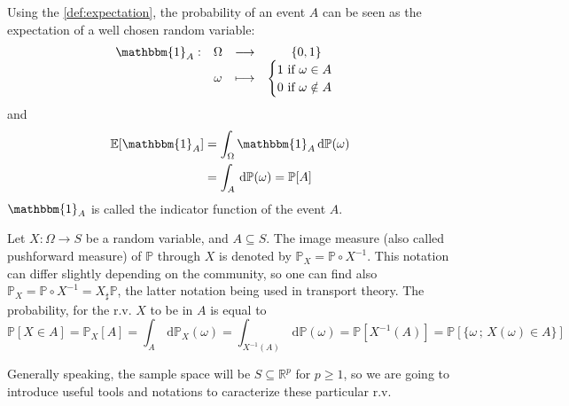 \documentclass[a4paper,11pt]{article}
\newcommand{\Ex}{\mathbb{E}}
\newcommand{\Prob}{\mathbb{P}}
\theoremstyle{defi}
\numberwithin{thmCounter}{section}
\begin{document}
\begin{remark}
  Using the \cref{def:expectation}, the probability of an event $A$ can be seen as the expectation of a well chosen random variable:
  \begin{equation*}
    \begin{array}{cccc}
      \mathbbm{1}_{A}:& \Omega& \longrightarrow& \{0,1\} \\
                      & \omega& \longmapsto & \begin{cases}
                        1\text{ if } \omega \in A \\
                        0 \text{ if } \omega \notin A
                                              \end{cases}
    \end{array}
  \end{equation*}
  and
  \begin{align*}
    \Ex[\mathbbm{1}_A] &= \int_{\Omega} \mathbbm{1}_A \, \mathrm{d}\Prob(\omega) \\
                       &= \int_{A} \, \mathrm{d}\Prob(\omega) = \Prob[A]
  \end{align*}
  $\mathbbm{1}_A$ is called the indicator function of the event $A$.
\end{remark}
\begin{definition}
  \label{def:image_measure}
  Let $X:\Omega \rightarrow S$ be a random variable, and $A \subseteq S$. The image measure (also called pushforward measure) of $\Prob$ through $X$ is denoted by $\Prob_X = \Prob \circ X^{-1}$. This notation can differ slightly depending on the community, so one can find also $ \Prob_X = \Prob \circ X^{-1} = X_{\sharp}\Prob$, the latter notation being used in transport theory. The probability, for the r.v. $X$ to be in $A$ is equal to
  \begin{equation*}
    \Prob[X \in A] = \Prob_X[A] = \int_{A}\,\mathrm{d}\Prob_X(\omega) =  \int_{X^{-1}(A)}\,\mathrm{d}\Prob(\omega) = \Prob[X^{-1}(A)] = \Prob[\{\omega\,;\,X(\omega) \in A\}]
  \end{equation*}
\end{definition}
Generally speaking, the sample space will be $S\subseteq \mathbb{R}^p$ for $p\geq 1$, so we are going to introduce useful tools and notations to caracterize these particular r.v.
\end{document}

